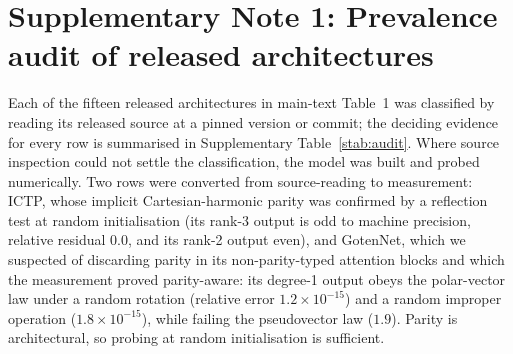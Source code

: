 
\setlength{\tabcolsep}{4pt}

\section*{Supplementary Note 1: Prevalence audit of released architectures}

Each of the fifteen released architectures in main-text Table~1 was classified by reading its released source at a pinned version or commit; the deciding evidence for every row is summarised in Supplementary Table~\ref{stab:audit}. Where source inspection could not settle the classification, the model was built and probed numerically. Two rows were converted from source-reading to measurement: ICTP, whose implicit Cartesian-harmonic parity was confirmed by a reflection test at random initialisation (its rank-3 output is odd to machine precision, relative residual $0.0$, and its rank-2 output even), and GotenNet, which we suspected of discarding parity in its non-parity-typed attention blocks and which the measurement proved parity-aware: its degree-1 output obeys the polar-vector law under a random rotation (relative error $1.2\times10^{-15}$) and a random improper operation ($1.8\times10^{-15}$), while failing the pseudovector law ($1.9$). Parity is architectural, so probing at random initialisation is sufficient.

